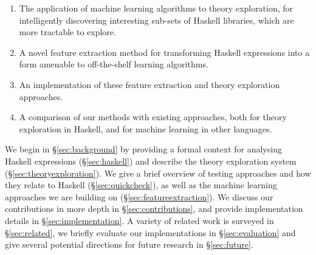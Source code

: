 \begin{enumerate}
  \item The application of machine learning algorithms to theory exploration, for intelligently discovering interesting sub-sets of Haskell libraries, which are more tractable to explore.
  \item A novel feature extraction method for transforming Haskell expressions into a form amenable to off-the-shelf learning algorithms.
  \item An implementation of these feature extraction and theory exploration approaches.
  \item A comparison of our methods with existing approaches, both for theory exploration in Haskell, and for machine learning in other languages.
\end{enumerate}

We begin in \S \ref{sec:background} by providing a formal context for analysing Haskell expressions (\S \ref{sec:haskell}) and describe the \qspec{} theory exploration system (\S \ref{sec:theoryexploration}). We give a brief overview of testing approaches and how they relate to Haskell (\S \ref{sec:quickcheck}), as well as the machine learning approaches we are building on (\S \ref{sec:featureextraction}). We discuss our contributions in more depth in \S \ref{sec:contributions}, and provide implementation details in \S \ref{sec:implementation}. A variety of related work is surveyed in \S \ref{sec:related}, we briefly evaluate our implementations in \S \ref{sec:evaluation} and give several potential directions for future research in \S \ref{sec:future}.
